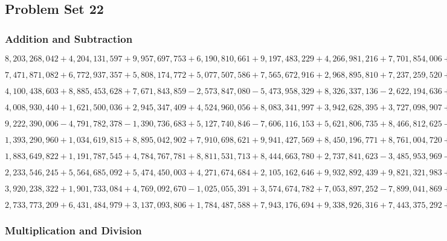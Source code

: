 \hypertarget{problem-set-22-6}{%
\subsection{Problem Set 22}\label{problem-set-22-6}}

\hypertarget{addition-and-subtraction-402}{%
\subsubsection{Addition and
Subtraction}\label{addition-and-subtraction-402}}

\(8,203,268,042+4,204,131,597+9,957,697,753+6,190,810,661+9,197,483,229+4,266,981,216+7,701,854,006+5,010,356,896+3,926,405,230+8,296,672,920\)

\(7,471,871,082+6,772,937,357+5,808,174,772+5,077,507,586+7,565,672,916+2,968,895,810+7,237,259,520+4,836,022,965+1,401,059,399+3,838,493,097\)

\(4,100,438,603+8,885,453,628+7,671,843,859-2,573,847,080-5,473,958,329+8,326,337,136-2,622,194,636+4,700,442,517+1,595,554,898-3,691,827,197\)

\(4,008,930,440+1,621,500,036+2,945,347,409+4,524,960,056+8,083,341,997+3,942,628,395+3,727,098,907+9,150,202,089+1,021,825,831+9,731,110,359\)

\(9,222,390,006-4,791,782,378-1,390,736,683+5,127,740,846-7,606,116,153+5,621,806,735+8,466,812,625-3,333,525,934+7,704,334,011+1,755,139,867\)

\(1,393,290,960+1,034,619,815+8,895,042,902+7,910,698,621+9,941,427,569+8,450,196,771+8,761,004,720+9,417,502,851+5,313,490,779+6,993,442,237\)

\(1,883,649,822+1,191,787,545+4,784,767,781+8,811,531,713+8,444,663,780+2,737,841,623-3,485,953,969-2,189,202,803-5,186,810,018-5,926,104,627\)

\(2,233,546,245+5,564,685,092+5,474,450,003+4,271,674,684+2,105,162,646+9,932,892,439+9,821,321,983+1,204,796,026+1,788,777,417+4,778,299,562\)

\(3,920,238,322+1,901,733,084+4,769,092,670-1,025,055,391+3,574,674,782+7,053,897,252-7,899,041,869+6,631,261,589-1,163,857,479-7,273,211,936\)

\(2,733,773,209+6,431,484,979+3,137,093,806+1,784,487,588+7,943,176,694+9,338,926,316+7,443,375,292+1,503,482,394+5,701,263,594+1,632,394,730\)

\hypertarget{multiplication-and-division-400}{%
\subsubsection{Multiplication and
Division}\label{multiplication-and-division-400}}

